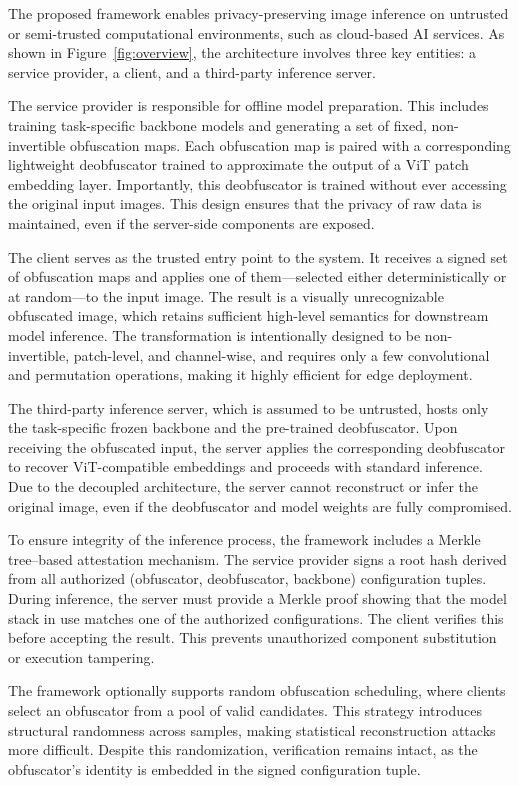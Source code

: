 \documentclass{ieeeaccess}
\begin{document}
The proposed framework enables privacy-preserving image inference on untrusted or semi-trusted computational environments, such as cloud-based AI services. As shown in Figure~\ref{fig:overview}, the architecture involves three key entities: a service provider, a client, and a third-party inference server.

The service provider is responsible for offline model preparation. This includes training task-specific backbone models and generating a set of fixed, non-invertible obfuscation maps. Each obfuscation map is paired with a corresponding lightweight deobfuscator trained to approximate the output of a ViT patch embedding layer. Importantly, this deobfuscator is trained without ever accessing the original input images. This design ensures that the privacy of raw data is maintained, even if the server-side components are exposed.

The client serves as the trusted entry point to the system. It receives a signed set of obfuscation maps and applies one of them---selected either deterministically or at random---to the input image. The result is a visually unrecognizable obfuscated image, which retains sufficient high-level semantics for downstream model inference. The transformation is intentionally designed to be non-invertible, patch-level, and channel-wise, and requires only a few convolutional and permutation operations, making it highly efficient for edge deployment.

The third-party inference server, which is assumed to be untrusted, hosts only the task-specific frozen backbone and the pre-trained deobfuscator. Upon receiving the obfuscated input, the server applies the corresponding deobfuscator to recover ViT-compatible embeddings and proceeds with standard inference. Due to the decoupled architecture, the server cannot reconstruct or infer the original image, even if the deobfuscator and model weights are fully compromised.

To ensure integrity of the inference process, the framework includes a Merkle tree--based attestation mechanism. The service provider signs a root hash derived from all authorized (obfuscator, deobfuscator, backbone) configuration tuples. During inference, the server must provide a Merkle proof showing that the model stack in use matches one of the authorized configurations. The client verifies this before accepting the result. This prevents unauthorized component substitution or execution tampering.

The framework optionally supports random obfuscation scheduling, where clients select an obfuscator from a pool of valid candidates. This strategy introduces structural randomness across samples, making statistical reconstruction attacks more difficult. Despite this randomization, verification remains intact, as the obfuscator's identity is embedded in the signed configuration tuple.
\end{document}
